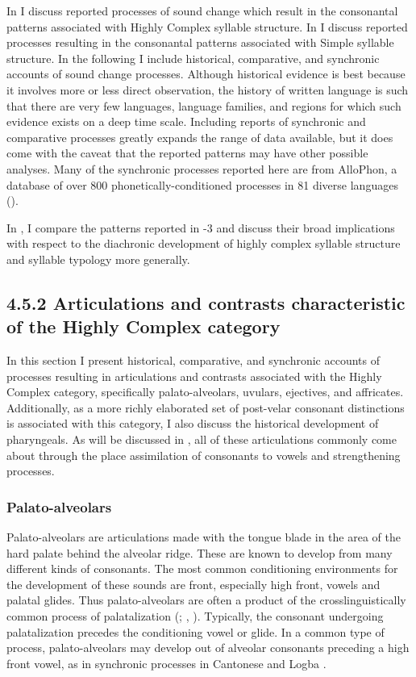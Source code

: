   In  I discuss reported processes of sound change which result in the consonantal patterns associated with Highly Complex syllable structure. In  I discuss reported processes resulting in the consonantal patterns associated with Simple syllable structure. In the following I include historical, comparative, and synchronic accounts of sound change processes. Although historical evidence is best because it involves more or less direct observation, the history of written language is such that there are very few languages, language families, and regions for which such evidence exists on a deep time scale. Including reports of synchronic and comparative processes greatly expands the range of data available, but it does come with the caveat that the reported patterns may have other possible analyses. Many of the synchronic processes reported here are from AlloPhon, a database of over 800 phonetically-conditioned processes in 81 diverse languages (\citealt{BybeeEasterday2019}).

  In , I compare the patterns reported in -3 and discuss their broad implications with respect to the diachronic development of highly complex syllable structure and syllable typology more generally.

\subsection{4.5.2 Articulations and contrasts characteristic of the Highly Complex category} 

  In this section I present historical, comparative, and synchronic accounts of processes resulting in articulations and contrasts associated with the Highly Complex category, specifically palato-alveolars, uvulars, ejectives, and affricates. Additionally, as a more richly elaborated set of post-velar consonant distinctions is associated with this category, I also discuss the historical development of pharyngeals. As will be discussed in , all of these articulations commonly come about through the place assimilation of consonants to vowels and strengthening processes.

\subsubsection{{Palato-alveolars}}\label{sec:4.5.2.1}

  Palato-alveolars are articulations made with the tongue blade in the area of the hard palate behind the alveolar ridge. These are known to develop from many different kinds of consonants. The most common conditioning environments for the development of these sounds are front, especially high front, vowels and palatal glides. Thus palato-alveolars are often a product of the crosslinguistically common process of palatalization (\citealt{Bhat1978}; \citealt{Bateman2007}, \citealt{BybeeEasterday2019}). Typically, the consonant undergoing palatalization precedes the conditioning vowel or glide. In a common type of process, palato-alveolars may develop out of alveolar consonants preceding a high front vowel, as in synchronic processes in Cantonese  and Logba .

